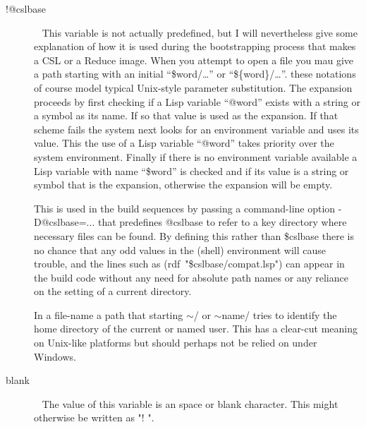 \documentclass[a4paper,11pt]{article}
\begin{document}
\begin{description}
\item [{\ttfamily !@cslbase}]  ~\newline
This variable is not actually predefined, but I will nevertheless give some
explanation of how it is used during the bootstrapping process that makes
a CSL or a Reduce image. When you attempt to open a file you mau give
a path starting with an initial ``\$word/\ldots'' or ``\$\{word\}/\ldots''.
these notations of course model typical Unix-style parameter substitution.
The expansion proceeds by first checking if a Lisp variable ``@word''
exists with a string or a symbol as its name. If so that value is used
as the expansion. If that scheme fails the system next looks for an
environment variable and uses its value. This the use of a Lisp variable
``@word'' takes priority over the system environment. Finally if there is
no environment variable available a Lisp variable with name ``\$word'' is
checked and if its value is a string or symbol that is the expansion,
otherwise the expansion will be empty.
  
This is used in the build sequences by passing a command-line
option {\ttfamily -D@cslbase=...} that predefines
{\ttfamily @cslbase} to refer to a key directory where necessary files
can be found.
By defining this rather than {\ttfamily \$cslbase} there is no chance that
any odd values in the (shell) environment will cause trouble, and the
lines such as {\ttfamily (rdf~"\$cslbase/compat.lsp")} can appear in the build
code without any need for absolute path names or any
reliance on the setting of a current directory.

In a file-name a path that starting {\ttfamily $\sim$/} or
{\ttfamily $\sim$name/} tries to identify the home directory of the
current or named user. This has a clear-cut meaning on Unix-like
platforms but should perhaps not be relied on under Windows.

\item [{\ttfamily blank}]  ~\newline
The value of this variable is an space or blank character. This
might otherwise be written as {\ttfamily "! "}.



\end{description}
\end{document}
